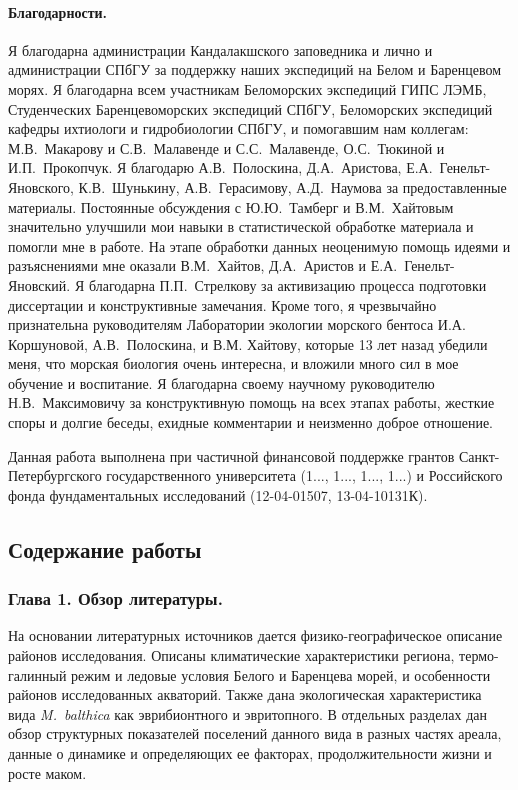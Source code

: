 \paragraph{Благодарности.}
\begin{small}
Я благодарна администрации Кандалакшского заповедника и лично  и администрации СПбГУ за поддержку наших экспедиций на Белом и Баренцевом морях.
Я благодарна всем участникам Беломорских экспедиций ГИПС ЛЭМБ, Студенческих Баренцевоморских экспедиций СПбГУ, Беломорских экспедиций кафедры ихтиологи и гидробиологии СПбГУ, и помогавшим нам коллегам: М.\:В.~Макарову и С.\:В.~Малавенде и С.\:С.~Малавенде, О.\:С.~Тюкиной и И.\:П.~Прокопчук. 
Я благодарю А.\:В.~Полоскина, Д.\:А.~Аристова, Е.\:А.~Генельт-Яновского, К.\:В.~Шунькину, А.\:В.~Герасимову, А.\:Д.~Наумова за предоставленные материалы.
Постоянные обсуждения с Ю.\:Ю.~Тамберг и В.\:М.~Хайтовым значительно улучшили мои навыки в статистической обработке материала и помогли мне в работе.
На этапе обработки данных неоценимую помощь идеями и разъяснениями мне оказали В.\:М.~Хайтов, Д.\:А.~Аристов и Е.\:А.~Генельт-Яновский.
Я благодарна П.\:П.~Стрелкову за активизацию процесса подготовки диссертации и конструктивные замечания.
Кроме того, я чрезвычайно признательна руководителям Лаборатории экологии морского бентоса И.\:А. Коршуновой, А.\:В.~Полоскина,  и В.\:М. Хайтову, которые 13 лет назад убедили меня, что морская биология очень интересна, и вложили много сил в мое обучение и воспитание. 
Я благодарна своему научному руководителю Н.\:В.~Максимовичу за конструктивную помощь на всех этапах работы, жесткие споры и долгие беседы, ехидные комментарии и неизменно доброе отношение.

\vspace{1ex}

Данная работа выполнена при частичной финансовой поддержке грантов Санкт-Петер\-бург\-ского государственного университета (1..., 1..., 1..., 1...) и Российского фонда фундаментальных исследований (12-04-01507, 13-04-10131\:К). 

\end{small}

\subsection*{Содержание работы}

\subsubsection*{Глава 1. Обзор литературы.}
На основании литературных источников дается физико-географическое описание районов исследования.
Описаны климатические характеристики региона, термо-галинный режим и ледовые условия Белого и Баренцева морей, и особенности районов исследованных акваторий.
Также дана экологическая характеристика вида \textit{M.~balthica} как эврибионтного и эвритопного.
В отдельных разделах дан обзор структурных показателей поселений данного вида в разных частях ареала, данные о динамике и определяющих ее факторах, продолжительности жизни и росте маком.


